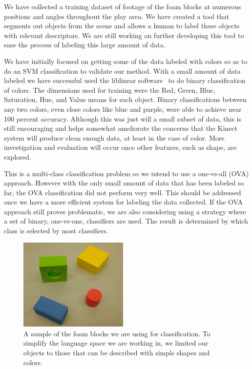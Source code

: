 \documentclass[11pt]{article}
\begin{document}
We have collected a training dataset of footage of the foam blocks at numerous 
positions and angles throughout the play area. We have created a tool that 
segments out objects from the scene and allows a human to label these objects 
with relevant descriptors.  We are still working on further developing this 
tool to ease the process of labeling this large amount of data.

We have initially focused on getting some of the data labeled with colors so as 
to do an SVM classification to validate our method.  With a small amount of 
data labeled we have successful used the liblinear software~\cite{LIBLINEAR} to 
do binary classification of colors.  The dimensions used for training were the 
Red, Green, Blue, Saturation, Hue, and Value means for each object.  Binary 
classifications between any two colors, even close colors like blue and purple, 
were able to achieve near 100 percent accuracy.  Although this was just will a 
small subset of data, this is still encouraging and helps somewhat ameliorate 
the concerns that the Kinect system will produce clean enough data, at least in 
the case of color.  More investigation and evaluation will occur once other 
features, such as shape, are explored.

This is a multi-class classification problem so we intend to use a one-vs-all 
(OVA) approach.  However with the only small amount of data that has been 
labeled so far, the OVA classification did not perform very well.  This should 
be addressed once we have a more efficient system for labeling the data 
collected.  If the OVA approach still proves problematic, we are also 
considering using a strategy where a set of binary, one-vs-one, classifiers are 
used.  The result is determined by which class is selected by most classifiers.


\begin{figure}
\centering
\includegraphics[width=0.48\textwidth]{figures/blocks.png}
\caption{A sample of the foam blocks we are using for classification. To
    simplify the language space we are working in, we limited our objects to
    those that can be described with simple shapes and colors.}
\label{fig:blocks}
\end{figure}
\end{document}
